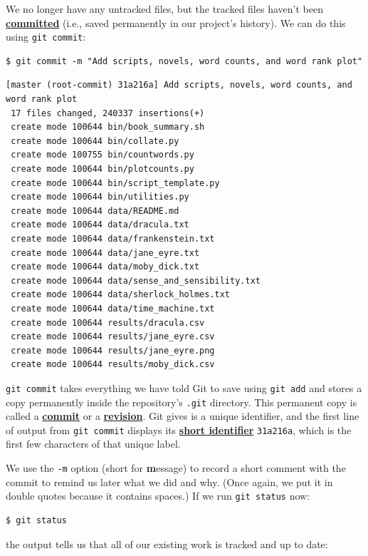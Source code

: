 \documentclass[
]{krantz}
\newcommand{\gref}[2]{\hyperlink{#2}{\textbf{#1}}}
\begin{document}
We no longer have any untracked files,
but the tracked files haven't been \gref{committed}{commit}
(i.e., saved permanently in our project's history).
We can do this using \texttt{git\ commit}:

\begin{verbatim}
$ git commit -m "Add scripts, novels, word counts, and word rank plot"
\end{verbatim}

\begin{verbatim}
[master (root-commit) 31a216a] Add scripts, novels, word counts, and word rank plot
 17 files changed, 240337 insertions(+)
 create mode 100644 bin/book_summary.sh
 create mode 100644 bin/collate.py
 create mode 100755 bin/countwords.py
 create mode 100644 bin/plotcounts.py
 create mode 100644 bin/script_template.py
 create mode 100644 bin/utilities.py
 create mode 100644 data/README.md
 create mode 100644 data/dracula.txt
 create mode 100644 data/frankenstein.txt
 create mode 100644 data/jane_eyre.txt
 create mode 100644 data/moby_dick.txt
 create mode 100644 data/sense_and_sensibility.txt
 create mode 100644 data/sherlock_holmes.txt
 create mode 100644 data/time_machine.txt
 create mode 100644 results/dracula.csv
 create mode 100644 results/jane_eyre.csv
 create mode 100644 results/jane_eyre.png
 create mode 100644 results/moby_dick.csv
\end{verbatim}

\texttt{git\ commit} takes everything we have told Git to save using \texttt{git\ add}
and stores a copy permanently inside the repository's \texttt{.git} directory.
This permanent copy is called a \gref{commit}{commit} or a \gref{revision}{revision}.
Git gives is a unique identifier,
and the first line of output from \texttt{git\ commit} displays
its \gref{short identifier}{short\_identifier\_git} \texttt{31a216a},
which is the first few characters of that unique label.

We use the \texttt{-m} option (short for \textbf{m}essage)
to record a short comment with the commit
to remind us later what we did and why.
(Once again,
we put it in double quotes because it contains spaces.)
If we run \texttt{git\ status} now:

\begin{verbatim}
$ git status
\end{verbatim}

the output tells us that
all of our existing work is tracked and up to date:
\end{document}
